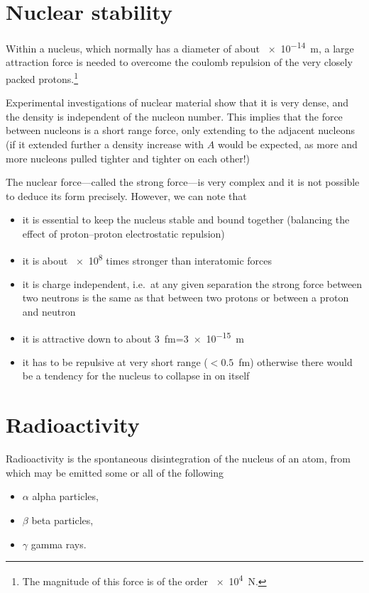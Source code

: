 \section{Nuclear stability}

Within a nucleus, which normally has a diameter of about \SI{e-14}{m}, a large attraction force is needed to overcome the coulomb repulsion of the very closely packed protons.\footnote{The magnitude of this force is of the order \SI{e4}{N}.}

Experimental investigations of nuclear material show that it is very dense, and the density is independent of the nucleon number.  This implies that the force between nucleons is a short range force, only extending to the adjacent nucleons (if it extended further a density increase with $A$ would be expected, as more and more nucleons pulled tighter and tighter on each other!)

The nuclear force---called the strong force---is very complex and it is not possible to deduce its form precisely.  However, we can note that
\begin{itemize}
\item it is essential to keep the nucleus stable and bound together (balancing the effect of proton--proton electrostatic repulsion)
\item it is about \num{e8} times stronger than interatomic forces
\item it is charge independent, i.e.\  at any given separation the strong force between two neutrons is the same as that between two protons or between a proton and neutron
\item it is attractive down to about \SI{3}{fm}=\SI{3e-15}{m}
\item it has to be repulsive at very short range ($<0.5$~fm) otherwise there would be a tendency for the nucleus to collapse in on itself
\end{itemize}

\section{Radioactivity}

Radioactivity is the spontaneous disintegration of the nucleus of an atom, from which may be emitted some or all of the following 
\begin{itemize}
\item $\alpha$ alpha particles,
\item $\beta$ beta particles,
\item $\gamma$ gamma rays.
\end{itemize}

